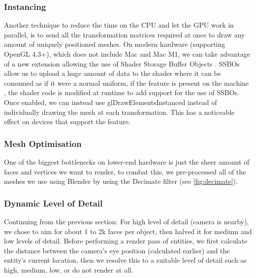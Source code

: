 \documentclass{article}
\begin{document}
\begin{multicols}{2}
                \subsubsection{Instancing}

                    Another technique to reduce the time on the CPU and let the GPU work in parallel, is to send all the transformation matrices required at once to draw any amount of uniquely positioned meshes. On modern hardware (supporting OpenGL 4.3+), which does not include Mac and Mac M1, we can take advantage of a new extension allowing the use of Shader Storage Buffer Objects \cite{ssbo}. SSBOs allow us to upload a huge amount of data to the shader where it can be consumed as if it were a normal uniform, if the feature is present on the machine \cite{extension-list}, the shader code is modified at runtime to add support for the use of SSBOs. Once enabled, we can instead use glDrawElementsInstanced instead of individually drawing the mesh at each transformation. This has a noticeable effect on devices that support the feature.

                \subsubsection{Mesh Optimisation}

                    One of the biggest bottlenecks on lower-end hardware is just the sheer amount of faces and vertices we want to render, to combat this, we pre-processed all of the meshes we use using Blender by using the Decimate filter (see \autoref{fig:decimate}).

                \subsubsection{Dynamic Level of Detail}

                    Continuing from the previous section: For high level of detail (camera is nearby), we chose to aim for about 1 to 2k faces per object, then halved it for medium and low levels of detail. Before performing a render pass of entities, we first calculate the distance between the camera’s eye position (calculated earlier) and the entity’s current location, then we resolve this to a suitable level of detail such as high, medium, low, or do not render at all.


        

\end{multicols}
\end{document}
